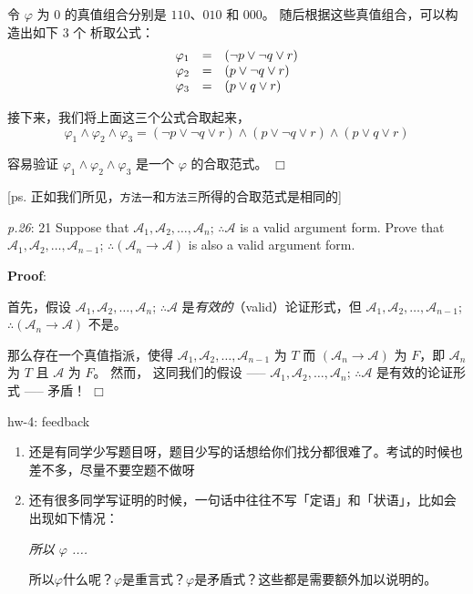 \documentclass[UTF8,12pt,a4paper]{ctexart}
\begin{document}
令 $\varphi$ 为 $0$ 的真值组合分别是
$110$、$010$ 和 $000$。
随后根据这些真值组合，可以构造出如下 3 个 析取公式：
\[\begin{array}{l l l}
	\varphi_1 
	&=&
	(\neg p \lor \neg q \lor r) \\ 
	
	\varphi_2
	&=&
	( p \lor \neg q \lor r) \\
	
	\varphi_3
	&=&
	( p \lor  q \lor r)  \\
\end{array}\]

接下来，我们将上面这三个公式合取起来，
\[
\varphi_1 \land \varphi_2 \land \varphi_3 = ( \neg p \lor \neg q \lor  r) \land  ( p \lor \neg q \lor r) \land  ( p \lor  q \lor r)
\]

容易验证  $\varphi_1 \land \varphi_2 \land \varphi_3$ 是一个 $\varphi$ 的合取范式。
\hfill $\Box$

[ps. 正如我们所见，\texttt{方法一}和\texttt{方法三}所得的合取范式是相同的] 

\vspace{3em}

\emph{p.26}: 21 \quad
Suppose that $\mathscr{A}_1,\mathscr{A}_2,\dots,\mathscr{A}_n$;  $\therefore\mathscr{A}$ is a valid argument form. Prove that $\mathscr{A}_1,\mathscr{A}_2,\dots,\mathscr{A}_{n-1}$;  $\therefore (\mathscr{A}_n \to \mathscr{A})$ is also a valid argument form.

\noindent\textbf{Proof}:

首先，假设
$\mathscr{A}_1,\mathscr{A}_2,\dots,\mathscr{A}_n$;  $\therefore\mathscr{A}$ 
是\textit{有效的}（valid）论证形式，但 $\mathscr{A}_1,\mathscr{A}_2,\dots,\mathscr{A}_{n-1}$;  $\therefore (\mathscr{A}_n \to \mathscr{A})$ 不是。 

那么存在一个真值指派，使得
$\mathscr{A}_1,\mathscr{A}_2,\dots,\mathscr{A}_{n-1}$ 为 $T$ 
而 $(\mathscr{A}_n \to \mathscr{A})$ 为 $F$，即 
$\mathscr{A}_n $ 为 $T$ 且 $\mathscr{A}$ 为 $F$。
然而，
这同我们的假设 ----- $\mathscr{A}_1,\mathscr{A}_2,\dots,\mathscr{A}_n$;  $\therefore\mathscr{A}$ 是有效的论证形式 ----- 矛盾！
\hfill $\Box$


\vspace{1em}
\dotfill
hw-4: feedback
\dotfill

\begin{enumerate}
	\item 还是有同学少写题目呀，题目少写的话想给你们找分都很难了。考试的时候也差不多，尽量不要空题不做呀 \faSadTear[regular]
	
	\item 还有很多同学写证明的时候，一句话中往往不写「定语」和「状语」，比如会出现如下情况：
	\begin{center}
		\textit{所以 $\varphi$ .... } 
	\end{center}
	所以$\varphi$什么呢？$\varphi$是重言式？$\varphi$是矛盾式？这些都是需要额外加以说明的。
\end{enumerate}
\end{document}
